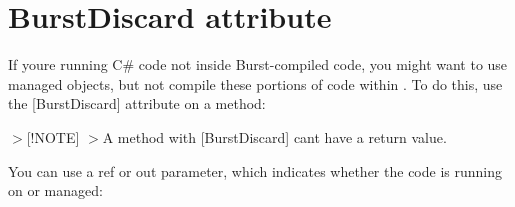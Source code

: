 \chapter{Burst\+Discard attribute}
\hypertarget{md__hey_tea_9_2_library_2_package_cache_2com_8unity_8burst_0d1_88_87_2_documentation_0i_2compilation-burstdiscard}{}\label{md__hey_tea_9_2_library_2_package_cache_2com_8unity_8burst_0d1_88_87_2_documentation_0i_2compilation-burstdiscard}
\label{md__hey_tea_9_2_library_2_package_cache_2com_8unity_8burst_0d1_88_87_2_documentation_0i_2compilation-burstdiscard_autotoc_md300}%
%
 If you\textquotesingle{}re running C\# code not inside Burst-\/compiled code, you might want to use managed objects, but not compile these portions of code within . To do this, use the {\ttfamily \mbox{[}Burst\+Discard\mbox{]}} attribute on a method\+:


\begin{DoxyCode}{0}
\DoxyCodeLine{\textcolor{preprocessor}{\ \#}}
\DoxyCodeLine{[BurstCompile]}
\DoxyCodeLine{\{}
\DoxyCodeLine{\ \ \ \ \{}
\DoxyCodeLine{\ \ \ \ \ \ \ \ \textcolor{comment}{//\ Only\ executed\ when\ running\ from\ a\ full\ .NET\ runtime}}
\DoxyCodeLine{\ \ \ \ \ \ \ \ \textcolor{comment}{//\ this\ method\ call\ will\ be\ discard\ when\ compiling\ this\ job\ with}}
\DoxyCodeLine{\ \ \ \ \ \ \ \ \textcolor{comment}{//\ [BurstCompile]\ attribute}}
\DoxyCodeLine{\ \ \ \ \}}
\DoxyCodeLine{}
\DoxyCodeLine{\ \ \ \ [BurstDiscard]}
\DoxyCodeLine{\ \ \ \ \{}
\DoxyCodeLine{\ \ \ \ \}}
\DoxyCodeLine{\}}

\end{DoxyCode}
 \texorpdfstring{$>$}{>}\mbox{[}!\+NOTE\mbox{]} \texorpdfstring{$>$}{>}A method with {\ttfamily \mbox{[}Burst\+Discard\mbox{]}} can\textquotesingle{}t have a return value.

You can use a {\ttfamily ref} or {\ttfamily out} parameter, which indicates whether the code is running on  or managed\+:


